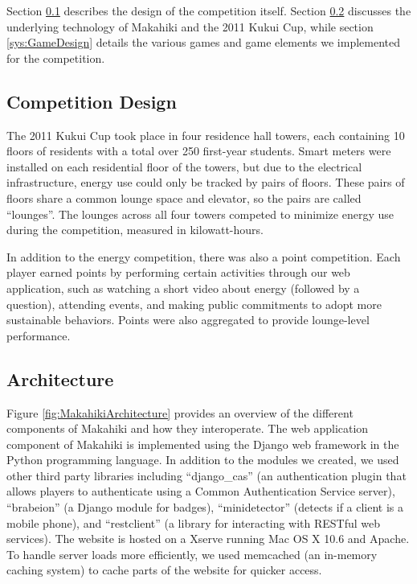 \documentclass{acm_proc_article-sp}
\begin{document}
Section \ref{sys:competition} describes the design of the competition itself. Section \ref{sys:Architecture} discusses the underlying technology of Makahiki and the 2011 Kukui Cup, while section \ref{sys:GameDesign} details the various games and game elements we implemented for the competition.

\subsection{Competition Design}
\label{sys:competition}

The 2011 Kukui Cup took place in four residence hall towers, each containing 10 floors of residents with a total over 250 first-year students. Smart meters were installed on each residential floor of the towers, but due to the electrical infrastructure, energy use could only be tracked by pairs of floors. These pairs of floors share a common lounge space and elevator, so the pairs are called ``lounges''. The lounges across all four towers competed to minimize energy use during the competition, measured in kilowatt-hours.

In addition to the energy competition, there was also a point competition. Each player earned points by performing certain activities through our web application, such as watching a short video about energy (followed by a question), attending events, and making public commitments to adopt more sustainable behaviors. Points were also aggregated to provide lounge-level performance.

\subsection{Architecture}
\label{sys:Architecture}

Figure \ref{fig:MakahikiArchitecture} provides an overview of the different components of Makahiki and how they interoperate. The web application component of Makahiki is implemented using the Django web framework in the Python programming language. In addition to the modules we created, we used other third party libraries including ``django\_cas'' (an authentication plugin that allows players to authenticate using a Common Authentication Service server), ``brabeion'' (a Django module for badges), ``minidetector'' (detects if a client is a mobile phone), and ``restclient'' (a library for interacting with RESTful web services). The website is hosted on a Xserve running Mac OS X 10.6 and Apache. To handle server loads more efficiently, we used memcached (an in-memory caching system) to cache parts of the website for quicker access.
\end{document}

